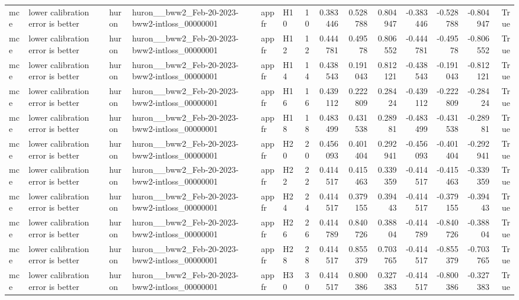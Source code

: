 \begin{longtable}{llllllrrrrrrrr}
mce & lower calibration error is better & huron & huron\_\_bww2\_Feb-20-2023-bww2-intloss\_00000001 & appfr & H10 & 10 & 0.383446 & 0.528788 & 0.804947 & -0.383446 & -0.528788 & -0.804947 & True \\
mce & lower calibration error is better & huron & huron\_\_bww2\_Feb-20-2023-bww2-intloss\_00000001 & appfr & H12 & 12 & 0.444781 & 0.49578 & 0.806552 & -0.444781 & -0.49578 & -0.806552 & True \\
mce & lower calibration error is better & huron & huron\_\_bww2\_Feb-20-2023-bww2-intloss\_00000001 & appfr & H14 & 14 & 0.438543 & 0.191043 & 0.812121 & -0.438543 & -0.191043 & -0.812121 & True \\
mce & lower calibration error is better & huron & huron\_\_bww2\_Feb-20-2023-bww2-intloss\_00000001 & appfr & H16 & 16 & 0.439112 & 0.222809 & 0.28424 & -0.439112 & -0.222809 & -0.28424 & True \\
mce & lower calibration error is better & huron & huron\_\_bww2\_Feb-20-2023-bww2-intloss\_00000001 & appfr & H18 & 18 & 0.483499 & 0.431538 & 0.28981 & -0.483499 & -0.431538 & -0.28981 & True \\
mce & lower calibration error is better & huron & huron\_\_bww2\_Feb-20-2023-bww2-intloss\_00000001 & appfr & H20 & 20 & 0.456093 & 0.401404 & 0.292941 & -0.456093 & -0.401404 & -0.292941 & True \\
mce & lower calibration error is better & huron & huron\_\_bww2\_Feb-20-2023-bww2-intloss\_00000001 & appfr & H22 & 22 & 0.414517 & 0.415463 & 0.339359 & -0.414517 & -0.415463 & -0.339359 & True \\
mce & lower calibration error is better & huron & huron\_\_bww2\_Feb-20-2023-bww2-intloss\_00000001 & appfr & H24 & 24 & 0.414517 & 0.379155 & 0.39443 & -0.414517 & -0.379155 & -0.39443 & True \\
mce & lower calibration error is better & huron & huron\_\_bww2\_Feb-20-2023-bww2-intloss\_00000001 & appfr & H26 & 26 & 0.414789 & 0.840726 & 0.38804 & -0.414789 & -0.840726 & -0.38804 & True \\
mce & lower calibration error is better & huron & huron\_\_bww2\_Feb-20-2023-bww2-intloss\_00000001 & appfr & H28 & 28 & 0.414517 & 0.855379 & 0.703765 & -0.414517 & -0.855379 & -0.703765 & True \\
mce & lower calibration error is better & huron & huron\_\_bww2\_Feb-20-2023-bww2-intloss\_00000001 & appfr & H30 & 30 & 0.414517 & 0.800386 & 0.327383 & -0.414517 & -0.800386 & -0.327383 & True \\

\end{longtable}
